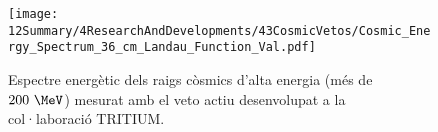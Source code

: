 \begin{itemize}
\begin{figure}[h]
\texttt{[image: 12Summary/4ResearchAndDevelopments/43CosmicVetos/Cosmic\_Energy\_Spectrum\_36\_cm\_Landau\_Function\_Val.pdf]}
\centering
\caption{Espectre energètic dels raigs còsmics d'alta energia (més de $200~\MeV$) mesurat amb el veto actiu desenvolupat a la col·laboració TRITIUM\label{fig:EspectreEnergeticVetoActiu}.}
\end{figure}

\end{itemize} 

